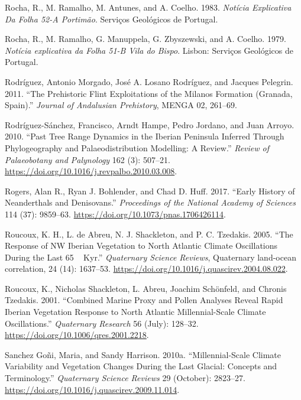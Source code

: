 \documentclass[
  a4paper,
  DIV=11,
  numbers=noendperiod]{scrreprt}
\newlength{\cslhangindent}
\newenvironment{CSLReferences}[2] %
 {\begin{list}{}{%
  \setlength{\itemindent}{0pt}
  \setlength{\leftmargin}{0pt}
  \setlength{\parsep}{0pt}
  \ifodd #1
   \setlength{\leftmargin}{\cslhangindent}
   \setlength{\itemindent}{-1\cslhangindent}
  \fi
  \setlength{\itemsep}{#2\baselineskip}}}
 {\end{list}}
\begin{document}
\begin{CSLReferences}{1}{0}
Rocha, R., M. Ramalho, M. Antunes, and A. Coelho. 1983. \emph{Not{í}cia
Explicativa Da {Folha} 52-{A Portim{ã}o}}. Servi{ç}os Geol{ó}gicos de
Portugal.

Rocha, R., M. Ramalho, G. Manuppela, G. Zbyszewski, and A. Coelho. 1979.
\emph{{Not{í}cia explicativa da Folha 51-B Vila do Bispo}}. Lisbon:
Servi{ç}os Geol{ó}gicos de Portugal.

Rodríguez, Antonio Morgado, José A. Losano Rodríguez, and Jacques
Pelegrin. 2011. {``{The Prehistoric Flint Exploitations of the Milanos
Formation (Granada, Spain)}.''} \emph{Journal of Andalusian Prehistory},
{MENGA 02}, 261--69.

Rodríguez-Sánchez, Francisco, Arndt Hampe, Pedro Jordano, and Juan
Arroyo. 2010. {``Past Tree Range Dynamics in the {Iberian Peninsula}
Inferred Through Phylogeography and Palaeodistribution Modelling: {A}
Review.''} \emph{Review of Palaeobotany and Palynology} 162 (3):
507--21. \url{https://doi.org/10.1016/j.revpalbo.2010.03.008}.

Rogers, Alan R., Ryan J. Bohlender, and Chad D. Huff. 2017. {``Early
History of {Neanderthals} and {Denisovans}.''} \emph{Proceedings of the
National Academy of Sciences} 114 (37): 9859--63.
\url{https://doi.org/10.1073/pnas.1706426114}.

Roucoux, K. H., L. de Abreu, N. J. Shackleton, and P. C. Tzedakis. 2005.
{``The Response of NW Iberian Vegetation to North Atlantic Climate
Oscillations During the Last 65 ~ Kyr.''} \emph{Quaternary Science
Reviews}, Quaternary land-ocean correlation, 24 (14): 1637--53.
\url{https://doi.org/10.1016/j.quascirev.2004.08.022}.

Roucoux, K., Nicholas Shackleton, L. Abreu, Joachim Schönfeld, and
Chronis Tzedakis. 2001. {``Combined Marine Proxy and Pollen Analyses
Reveal Rapid Iberian Vegetation Response to North Atlantic
Millennial-Scale Climate Oscillations.''} \emph{Quaternary Research} 56
(July): 128--32. \url{https://doi.org/10.1006/qres.2001.2218}.

Sanchez Goñi, Maria, and Sandy Harrison. 2010a. {``Millennial-Scale
Climate Variability and Vegetation Changes During the {Last Glacial}:
{Concepts} and Terminology.''} \emph{Quaternary Science Reviews} 29
(October): 2823--27.
\url{https://doi.org/10.1016/j.quascirev.2009.11.014}.


\end{CSLReferences}
\end{document}
